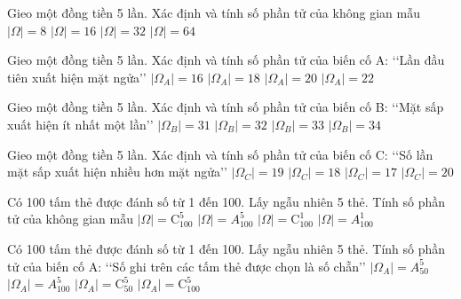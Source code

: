 \begin{ex}
Gieo một đồng tiền 5 lần. Xác định và tính số phần tử của không gian mẫu
\choice
{$|\Omega|=8$}
{$|\Omega|=16$}
{\True $|\Omega|=32$}
{$|\Omega|=64$}
\end{ex}
\begin{ex}
Gieo một đồng tiền 5 lần. Xác định và tính số phần tử của biến cố A: \lq\lq   Lần đầu tiên xuất hiện mặt ngửa\rq\rq 
\choice
{\True $|\Omega_A|=16$}
{$|\Omega_A|=18$}
{$|\Omega_A|=20$}
{$|\Omega_A|=22$}
\end{ex}
\begin{ex}
Gieo một đồng tiền 5 lần. Xác định và tính số phần tử của biến cố B: \lq\lq   Mặt sấp xuất hiện ít nhất một lần\rq\rq 
\choice
{\True $|\Omega_B|=31$}
{$|\Omega_B|=32$}
{$|\Omega_B|=33$}
{$|\Omega_B|=34$}
\end{ex}
\begin{ex}
Gieo một đồng tiền 5 lần. Xác định và tính số phần tử của biến cố C: \lq\lq   Số lần mặt sấp xuất hiện nhiều hơn mặt ngửa\rq\rq 
\choice
{$|\Omega_C|=19$}
{$|\Omega_C|=18$}
{\True $|\Omega_C|=17$}
{$|\Omega_C|=20$}
\end{ex}
\begin{ex}
Có 100 tấm thẻ được đánh số từ 1 đến 100. Lấy ngẫu nhiên 5 thẻ. Tính số phần tử của không gian mẫu
\choice
{\True $|\Omega|=\mathrm{C}_{100}^5$}
{$|\Omega|=A_{100}^5$}
{$|\Omega|=\mathrm{C}_{100}^1$}
{$|\Omega|=A_{100}^1$}
\end{ex}
\begin{ex}
Có 100 tấm thẻ được đánh số từ 1 đến 100. Lấy ngẫu nhiên 5 thẻ. Tính số phần tử của biến cố A: \lq\lq   Số ghi trên các tấm thẻ được chọn là số chẵn\rq\rq 
\choice
{$|\Omega_A|=A_{50}^5$}
{$|\Omega_A|=A_{100}^5$}
{\True $|\Omega_A|=\mathrm{C}_{50}^5$}
{$|\Omega_A|=\mathrm{C}_{100}^5$}
\end{ex}
